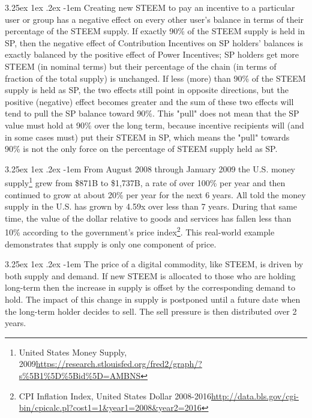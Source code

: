 \documentclass{article}
\makeatletter
\renewcommand\paragraph{\@startsection{paragraph}{5}{\z@}%
  {3.25ex \@plus1ex \@minus.2ex}%
  {-1em}%
  {\normalfont\normalsize\bfseries}}
\makeatother
\begin{document}
			\paragraph{}
				Creating new STEEM to pay an incentive to a particular user or group has a negative effect on every other user's balance in terms of their percentage of the STEEM supply. If exactly 90\% of the STEEM supply is held in SP, then the negative effect of Contribution Incentives on SP holders' balances is exactly balanced by the positive effect of Power Incentives; SP holders get more STEEM (in nominal terms) but their percentage of the chain (in terms of fraction of the total supply) is unchanged. If less (more) than 90\% of the STEEM supply is held as SP, the two effects still point in opposite directions, but the positive (negative) effect becomes greater and the sum of these two effects will tend to pull the SP balance toward 90\%. This "pull" does not mean that the SP value must hold at 90\% over the long term, because incentive recipients will (and in some cases must) put their STEEM in SP, which means the "pull" towards 90\% is not the only force on the percentage of STEEM supply held as SP.

			\paragraph{}
				From August 2008 through January 2009 the U.S. money supply\footnote{United States Money Supply, 2009\newline\url{https://research.stlouisfed.org/fred2/graph/?s\%5B1\%5D\%5Bid\%5D=AMBNS}} grew from \$871B to \$1,737B, a rate of over 100\% per year and then continued to grow at about 20\% per year for the next 6 years. All told the money supply in the U.S. has grown by 4.59x over less than 7 years. During that same time, the value of the dollar relative to goods and services has fallen less than 10\% according to the government's price index\footnote{CPI Inflation Index, United States Dollar 2008-2016\newline\url{http://data.bls.gov/cgi-bin/cpicalc.pl?cost1=1&year1=2008&year2=2016}}. This real-world example demonstrates that supply is only one component of price.

			\paragraph{}
				The price of a digital commodity, like STEEM, is driven by both supply and demand. If new STEEM is allocated to those who are holding long-term then the increase in supply is offset by the corresponding demand to hold. The impact of this change in supply is postponed until a future date when the long-term holder decides to sell. The sell pressure is then distributed over 2 years.
\end{document}
